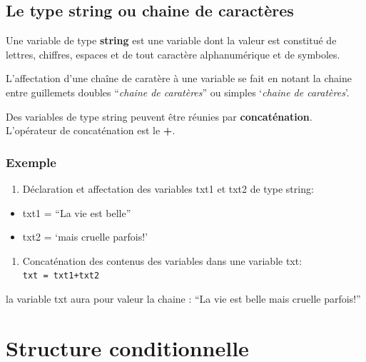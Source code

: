 \documentclass[11pt]{article}
\providecommand{\tightlist}{%
      \setlength{\itemsep}{0pt}\setlength{\parskip}{0pt}}
\begin{document}
    \hypertarget{le-type-string-ou-chaine-de-caractuxe8res}{%
\subsection{Le type string ou chaine de
caractères}\label{le-type-string-ou-chaine-de-caractuxe8res}}

Une variable de type \textbf{string} est une variable dont la valeur est
constitué de lettres, chiffres, espaces et de tout caractère
alphanumérique et de symboles.

L'affectation d'une chaîne de caratère à une variable se fait en notant
la chaine entre guillemets doubles ``\emph{chaine de caratères}'' ou
simples `\emph{chaine de caratères}'.

Des variables de type string peuvent être réunies par
\textbf{concaténation}. L'opérateur de concaténation est le \textbf{+}.

\hypertarget{exemple}{%
\subsubsection*{Exemple}\label{exemple}}

\begin{enumerate}
\def\labelenumi{\arabic{enumi}.}
\tightlist
\item
  Déclaration et affectation des variables txt1 et txt2 de type string:
\end{enumerate}

\begin{itemize}
\tightlist
\item
  txt1 = ``La vie est belle''
\item
  txt2 = `mais cruelle parfois!'
\end{itemize}

\begin{enumerate}
\def\labelenumi{\arabic{enumi}.}
\setcounter{enumi}{1}
\tightlist
\item
  Concaténation des contenus des variables dans une variable txt:
  \texttt{txt\ =\ txt1+txt2}
\end{enumerate}

la variable txt aura pour valeur la chaine : ``La vie est belle mais
cruelle parfois!''

    \hypertarget{structure-conditionnelle}{%
\section{Structure conditionnelle}\label{structure-conditionnelle}}
\end{document}
